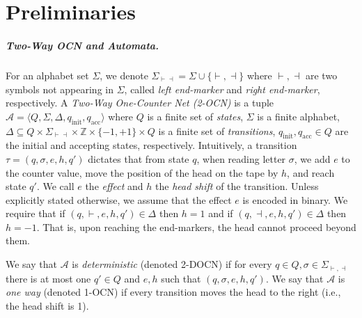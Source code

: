 \documentclass[11pt,a4paper]{amsart}
\theoremstyle{definition}
\newcommand{\tup}[1]{\langle #1 \rangle}
\newcommand{\lmark}{\vdash}
\newcommand{\rmark}{\dashv}
\newcommand{\initstate}{q_{\mathrm{init}}}
\newcommand{\accstate}{q_{\mathrm{acc}}}
\newcommand{\bbZ}{\mathbb{Z}}
\newcommand{\cA}{\mathcal{A}}
\begin{document}
	\section{Preliminaries}
	\label{sec:prelim}
	\subparagraph*{Two-Way OCN and Automata.} For an alphabet set $\Sigma$, we denote
	$\Sigma_{\lmark\rmark}=\Sigma\cup \{\lmark,\rmark\}$ where $\lmark,\rmark$ are two symbols
	not appearing in $\Sigma$, called \emph{left end-marker} and \emph{right end-marker},
	respectively.  A \emph{Two-Way One-Counter Net (2-OCN)} is a tuple
	$\cA=\tup{Q,\Sigma,\Delta,\initstate,\accstate}$ where $Q$ is a finite set
	of \emph{states}, $\Sigma$ is a finite alphabet, $\Delta\subseteq
	Q\times \Sigma_{\lmark\rmark}\times \bbZ\times \{-1,+1\}\times Q$ is a finite set of \emph{transitions}, $\initstate,\accstate\in Q$ are the initial and accepting states, respectively. 
	Intuitively, a transition $\tau=(q,\sigma,e,h,q')$ dictates that from state $q$, when reading letter $\sigma$, we add $e$ to the counter value, move the position of the head on the tape by $h$, and reach state $q'$. We call $e$ 
	the \emph{effect} and  $h$ the \emph{head shift} of the transition. Unless explicitly stated otherwise, we assume that the effect $e$ is encoded in binary.
	We require that if $(q,\lmark,e,h,q')\in \Delta$ then $h=1$ and if
	$(q,\rmark,e,h,q')\in \Delta$ then $h=-1$. That is, upon reaching the end-markers, the head cannot proceed beyond them.
	
	We say that $\cA$ is \emph{deterministic} (denoted 2-DOCN) if for every $q\in
	Q,\sigma\in \Sigma_{\lmark,\rmark}$ there is at most one $q'\in Q$ and $e,h$ such that
	$(q,\sigma,e,h,q')$. We say that $\cA$ is \emph{one way} (denoted 1-OCN) if every
	transition moves the head to the right (i.e., the head shift is 1).
	
\end{document}
